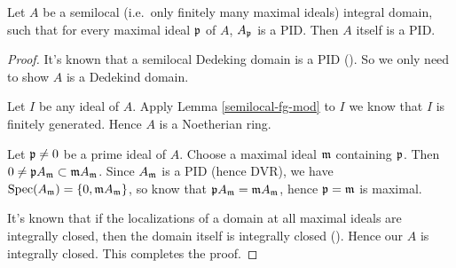 \begin{lem}
\label{semilocal-PID}
\leanok
Let $A$ be a semilocal (i.e.~only finitely many maximal ideals)
integral domain,
such that for every maximal ideal ${\mathfrak{p}}$ of $A$, $A_{\mathfrak{p}}$ is a PID.
Then $A$ itself is a PID.
\end{lem}

\begin{proof}
\leanok
It's known that a semilocal Dedeking domain is a PID
().
So we only need to show $A$ is a Dedekind domain.

Let $I$ be any ideal of $A$. Apply Lemma \ref{semilocal-fg-mod} to $I$ we know that
$I$ is finitely generated. Hence $A$ is a Noetherian ring.

Let ${\mathfrak{p}}\neq 0$ be a prime ideal of $A$.
Choose a maximal ideal ${\mathfrak{m}}$ containing ${\mathfrak{p}}$.
Then $0\neq{\mathfrak{p}} A_{\mathfrak{m}}\subset{\mathfrak{m}} A_{\mathfrak{m}}$. Since $A_{\mathfrak{m}}$ is a PID
(hence DVR), we have
${\mathrm{Spec}}(A_{\mathfrak{m}})=\{0,{\mathfrak{m}} A_{\mathfrak{m}}\}$,
so know that ${\mathfrak{p}} A_{\mathfrak{m}}={\mathfrak{m}} A_{\mathfrak{m}}$, hence ${\mathfrak{p}}={\mathfrak{m}}$ is maximal.

It's known that if the localizations of a domain at all maximal ideals
are integrally closed, then the domain itself is integrally closed
().
Hence our $A$ is integrally closed. This completes the proof.
\end{proof}

